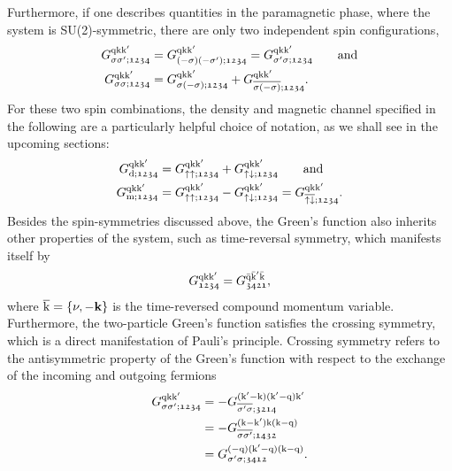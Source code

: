 \documentclass[../../main.tex]{subfiles}
\begin{document}
Furthermore, if one describes quantities in the paramagnetic phase, where the system is SU(2)-symmetric, there are only two independent spin configurations,
\begin{subequations}
\begin{align}
	G_{\sigma\sigma';\mathfrak{1234}}^{\text{q}\text{k}\text{k}'}&=G_{(-\sigma)(-\sigma');\mathfrak{1234}}^{\text{q}\text{k}\text{k}'}=G_{\sigma'\sigma;\mathfrak{1234}}^{\text{q}\text{k}\text{k}'}\qquad\text{and}\\
	G_{\sigma\sigma;\mathfrak{1234}}^{\text{q}\text{k}\text{k}'}&=G_{\sigma(-\sigma);\mathfrak{1234}}^{\text{q}\text{k}\text{k}'}+G_{\overline{\sigma(-\sigma)};\mathfrak{1234}}^{\text{q}\text{k}\text{k}'}.
\end{align}
\end{subequations}
For these two spin combinations, the density and magnetic channel specified in the following are a particularly helpful choice of notation, as we shall see in the upcoming sections: 
\begin{subequations}
\begin{align}
	G_{\text{d};\mathfrak{1234}}^{\text{q}\text{k}\text{k}'}&=G_{\uparrow\uparrow;\mathfrak{1234}}^{\text{q}\text{k}\text{k}'}+G_{\uparrow\downarrow;\mathfrak{1234}}^{\text{q}\text{k}\text{k}'}\qquad\text{and}\label{eq:two_particle_green_density}\\
	G_{\text{m};\mathfrak{1234}}^{\text{q}\text{k}\text{k}'}&=G_{\uparrow\uparrow;\mathfrak{1234}}^{\text{q}\text{k}\text{k}'}-G_{\uparrow\downarrow;\mathfrak{1234}}^{\text{q}\text{k}\text{k}'}=G_{\overline{\uparrow\downarrow};\mathfrak{1234}}^{\text{q}\text{k}\text{k}'}.\label{eq:two_particle_green_magnetic}
\end{align}
\end{subequations}
Besides the spin-symmetries discussed above, the Green's function also inherits other properties of the system, such as time-reversal symmetry, which manifests itself by
\begin{align}
	G_{\mathfrak{1234}}^{\text{q}\text{k}\text{k}'}=G_{\mathfrak{3421}}^{\bar{\text{q}}\bar{\text{k}}'\bar{\text{k}}},
\end{align} 
where $\overline{\text{k}}=\{\nu,-\textbf{k}\}$ is the time-reversed compound momentum variable. Furthermore, the two-particle Green's function satisfies the crossing symmetry, which is a direct manifestation of Pauli's principle. Crossing symmetry refers to the antisymmetric property of the Green's function with respect to the exchange of the incoming and outgoing fermions
\begin{subequations}
\begin{align}
	G_{\sigma\sigma';\mathfrak{1234}}^{\text{q}\text{k}\text{k}'}&= -G_{\overline{\sigma'\sigma};\mathfrak{3214}}^{(\text{k}'-\text{k})(\text{k}'-\text{q})\text{k}'}\label{eq:crossing_sym_1}\\
	&= -G_{\overline{\sigma\sigma'};\mathfrak{1432}}^{(\text{k}-\text{k}')\text{k}(\text{k}-\text{q})}\label{eq:crossing_sym_2}\\
	&= G_{\sigma'\sigma;\mathfrak{3412}}^{(-\text{q})(\text{k}'-\text{q})(\text{k}-\text{q})}.\label{eq:crossing_sym_3}
\end{align}
\end{subequations}
\end{document}
